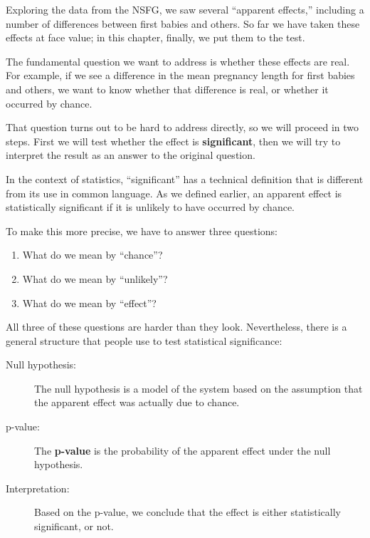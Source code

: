 \documentclass[12pt]{book}
\begin{document}
Exploring the data from the NSFG, we saw several ``apparent effects,''
including a number of differences between first babies and others.
So far we have taken these effects at face value; in this chapter,
finally, we put them to the test.

The fundamental question we want to address is whether these effects
are real.  For example, if we see a difference in the mean pregnancy
length for first babies and others, we want to know whether that
difference is real, or whether it occurred by chance.

That question turns out to be hard to address directly, so we will
proceed in two steps.  First we will test whether the effect is {\bf
  significant}, then we will try to interpret the result
  as an answer to the original question.

In the context of statistics, ``significant'' has a technical
definition that is different from its use in common language.
As we defined earlier, an apparent effect is statistically
significant if it is unlikely to have occurred by chance.

To make this more precise, we have to answer three questions:

\begin{enumerate}

\item What do we mean by ``chance''?

\item What do we mean by ``unlikely''?

\item What do we mean by ``effect''?

\end{enumerate}

All three of these questions are harder than they look.  Nevertheless,
there is a general structure that people use to test statistical
significance:

\begin{description}

\item[Null hypothesis:] The null hypothesis is a model of the system
  based on the assumption that the apparent effect was actually due to
  chance.

\item[p-value:] The {\bf p-value} is the probability of the apparent
  effect under the null hypothesis.

\item[Interpretation:] Based on the p-value, we conclude that the
  effect is either statistically significant, or not.

\end{description}
\end{document}
